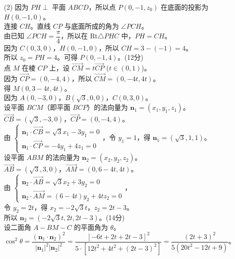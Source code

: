 {  (2) 因为 \(PH \perp\) 平面 \(ABCD\)，所以点 \(P(0,-1,z_0)\) 在底面的投影为 \(H(0,-1,0)\)。\\
  连接 \(CH\)。直线 \(CP\) 与底面所成的角为 \(\angle PCH\)。\\
  由已知 \(\angle PCH = \dfrac{\pi}{4}\)，所以在 Rt\(\triangle PHC\) 中，\(PH = CH\)。\\
  因为 \(C(0,3,0)\)，\(H(0,-1,0)\)，所以 \(CH = 3 - (-1) = 4\)。\\
  所以 \(z_0 = PH = 4\)。可得 \(P(0,-1,4)\)。\hfill (12分)\\
  点 \(M\) 在棱 \(CP\) 上，设 \(\overrightarrow{CM} = t \overrightarrow{CP}\) (\(t \in (0,1)\))。\\
  因为 \(\overrightarrow{CP} = (0,-4,4)\)，所以 \(\overrightarrow{CM} = (0, -4t, 4t)\)。\\
  得 \(M(0, 3-4t, 4t)\)。\\
  因为 \(A(0,-3,0)\)，\(B(\sqrt{3},0,0)\)，\(C(0,3,0)\)。\\
  设平面 \(BCM\)（即平面 \(BCP\)）的法向量为 \(\boldsymbol{n}_1 = (x_1, y_1, z_1)\)。\\
  \(\overrightarrow{CB} = (\sqrt{3}, -3, 0)\)，\(\overrightarrow{CP} = (0, -4, 4)\)。\\
  由 \(\begin{cases} \boldsymbol{n}_1 \cdot \overrightarrow{CB} = \sqrt{3}x_1 - 3y_1 = 0 \\ \boldsymbol{n}_1 \cdot \overrightarrow{CP} = -4y_1 + 4z_1 = 0 \end{cases}\)，令 \(y_1 = 1\)，得 \(\boldsymbol{n}_1 = (\sqrt{3}, 1, 1)\)。\\
  设平面 \(ABM\) 的法向量为 \(\boldsymbol{n}_2 = (x_2, y_2, z_2)\)。\\
  \(\overrightarrow{AB} = (\sqrt{3}, 3, 0)\)，\(\overrightarrow{AM} = (0, 6-4t, 4t)\)。\\
  由 \(\begin{cases} \boldsymbol{n}_2 \cdot \overrightarrow{AB} = \sqrt{3}x_2 + 3y_2 = 0 \\ \boldsymbol{n}_2 \cdot \overrightarrow{AM} = (6-4t)y_2 + 4tz_2 = 0 \end{cases}\)，\\
  令 \(y_2 = 2t\)，得 \(x_2 = -2\sqrt{3}t\)，\(z_2 = 2t-3\)。\\
  所以 \(\boldsymbol{n}_2 = (-2\sqrt{3}t, 2t, 2t-3)\)。\hfill (14分)\\
  设二面角 \(A-BM-C\) 的平面角为 \(\theta\)。\\
  \(\cos^2\theta = \dfrac{(\boldsymbol{n}_1 \cdot \boldsymbol{n}_2)^2}{|\boldsymbol{n}_1|^2 |\boldsymbol{n}_2|^2} = \dfrac{[-6t + 2t + 2t - 3]^2}{5 \cdot [12t^2 + 4t^2 + (2t-3)^2]} = \dfrac{(2t+3)^2}{5(20t^2-12t+9)}\)。\\
}
